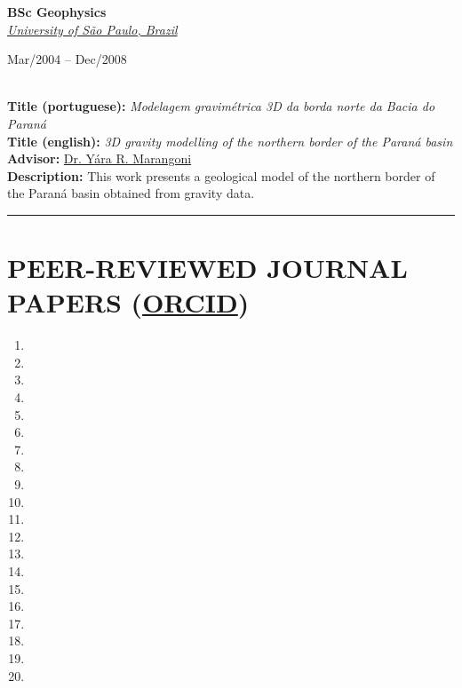 \documentclass[11pt,a4paper,onecolumn]{article}
\begin{document}
\medskip

\noindent \textbf{\Large BSc Geophysics} \\
\noindent \href{https://www.iag.usp.br/international/}{\textsl{University of S\~{a}o Paulo, Brazil}} \hfill \parbox{0.25\textwidth}{\raggedleft Mar/2004 -- Dec/2008} \vspace{0.3\baselineskip} \\
\noindent \textbf{Title (portuguese):} \textit{Modelagem gravim\'{e}trica 3D da borda norte da Bacia do Paran\'{a}} \\
\noindent \textbf{Title (english):} \textit{3D gravity modelling of the northern border of the Paran\'{a} basin} \\
\noindent \textbf{Advisor:} \href{https://orcid.org/0000-0003-4329-1787}{Dr. Y{\'a}ra R. Marangoni} \\
\noindent \textbf{Description:} This work presents a geological model of the northern border of the Paran\'{a} basin obtained from gravity data. \\

\pagebreak \hrule


\section*{PEER-REVIEWED JOURNAL PAPERS (\href{https://orcid.org/0000-0002-6338-4086}{ORCID})}


\begin{enumerate}[leftmargin=*, label=\textbf{(\arabic*)}]
	\item {}
	\item {}
	\item {}
	\item {}
	\item {}
	\item {}
	\item {}
	\item {}
	\item {}
	\item {}
	\item {}
	\item {}
	\item {}
	\item {}
	\item {}
	\item {}
	\item {}
	\item {}
	\item {}
	\item {}
\end{enumerate}
\end{document}
